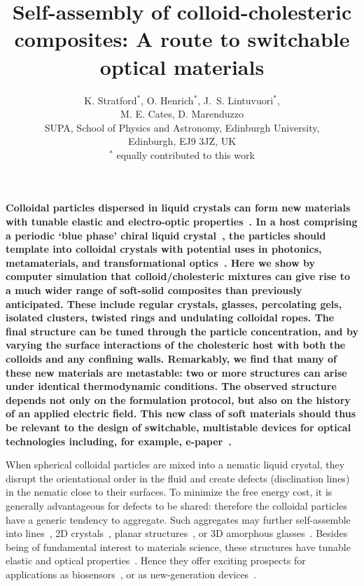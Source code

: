 \documentclass[12pt]{article}
\begin{document}
\title{Self-assembly of colloid-cholesteric composites: A route to switchable optical materials}
\author{K. Stratford$^{*}$, O. Henrich$^{*}$, J.~S. Lintuvuori$^{*}$,\\
M. E. Cates, D. Marenduzzo \\ 
{\small SUPA, School of Physics and Astronomy, Edinburgh University,} \\
\small{Edinburgh, EJ9 3JZ, UK}\\
\small{$^{*}$ equally contributed to this work}}
\date{}

\maketitle

{\bf Colloidal particles dispersed in liquid crystals can form new materials with tunable elastic and electro-optic properties~\cite{stark}. In a host comprising  a periodic `blue phase' chiral liquid crystal~\cite{mermin}, the particles should template into colloidal crystals \cite{miha} with potential uses in photonics, metamaterials, and transformational optics~\cite{lavrentovich}. 
Here we show by computer simulation that colloid/cholesteric mixtures can give rise to a much wider range of soft-solid composites than previously anticipated. These include regular crystals, glasses, percolating gels, isolated clusters, twisted rings and undulating colloidal ropes. The final structure can be tuned through the particle concentration, and by varying the surface interactions of the cholesteric host with both the colloids and any confining walls. 
Remarkably, we find that many of these new materials are metastable: two or more structures can arise under identical thermodynamic conditions. The observed structure depends not only on the formulation protocol,
but also on the history of an applied electric field.  
This new class of soft materials should thus be relevant to the design of switchable, multistable devices for optical technologies including, for example, e-paper~\cite{epaper}.}

When spherical colloidal particles are mixed into a nematic liquid crystal, 
they disrupt the orientational order in the fluid and create defects (disclination lines) in the nematic close to their surfaces. To minimize the free energy cost, it is generally advantageous for defects to be shared:
therefore the colloidal particles have a generic tendency to aggregate. Such aggregates may further 
self-assemble into lines~\cite{wiresmiha}, 2D crystals~\cite{zumer}, 
planar structures~\cite{tanaka}, or 3D amorphous glasses~\cite{tiffany}.
Besides being of fundamental interest to materials science, these
structures have tunable elastic and optical properties~\cite{stark}. Hence 
they offer exciting prospects for applications as biosensors~\cite{abbott}, or
as new-generation devices~\cite{colloiddevice,electrophoresis}.
\end{document}
